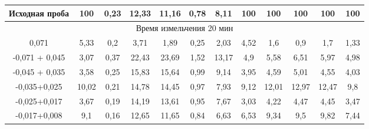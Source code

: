 {\begin{longtable}[c]{|p{}ccccccccccc|}
\multicolumn{1}{|c|}{Исходная проба} & \multicolumn{1}{c|}{100} & \multicolumn{1}{c|}{0,23} & \multicolumn{1}{c|}{12,33} & \multicolumn{1}{c|}{11,16} & \multicolumn{1}{c|}{0,78} & \multicolumn{1}{c|}{8,11} & \multicolumn{1}{c|}{100} & \multicolumn{1}{c|}{100} & \multicolumn{1}{c|}{100} & \multicolumn{1}{c|}{100} & 100 \\ \hline
\multicolumn{12}{|c|}{Время измельчения 20 мин} \\ \hline
\multicolumn{1}{|c|}{0,071} & \multicolumn{1}{c|}{5,33} & \multicolumn{1}{c|}{0,2} & \multicolumn{1}{c|}{3,71} & \multicolumn{1}{c|}{1,89} & \multicolumn{1}{c|}{0,25} & \multicolumn{1}{c|}{2,03} & \multicolumn{1}{c|}{4,52} & \multicolumn{1}{c|}{1,6} & \multicolumn{1}{c|}{0,9} & \multicolumn{1}{c|}{1,7} & 1,33 \\ \hline
\multicolumn{1}{|c|}{-0,071 + 0,045} & \multicolumn{1}{c|}{3,07} & \multicolumn{1}{c|}{0,37} & \multicolumn{1}{c|}{22,43} & \multicolumn{1}{c|}{23,69} & \multicolumn{1}{c|}{1,52} & \multicolumn{1}{c|}{13,17} & \multicolumn{1}{c|}{4,9} & \multicolumn{1}{c|}{5,58} & \multicolumn{1}{c|}{6,51} & \multicolumn{1}{c|}{5,97} & 4,98 \\ \hline
\multicolumn{1}{|c|}{-0,045 + 0,035} & \multicolumn{1}{c|}{3,58} & \multicolumn{1}{c|}{0,25} & \multicolumn{1}{c|}{15,83} & \multicolumn{1}{c|}{15,64} & \multicolumn{1}{c|}{0,99} & \multicolumn{1}{c|}{9,14} & \multicolumn{1}{c|}{3,95} & \multicolumn{1}{c|}{4,59} & \multicolumn{1}{c|}{5,01} & \multicolumn{1}{c|}{4,55} & 4,03 \\ \hline
\multicolumn{1}{|c|}{-0,035+0,025} & \multicolumn{1}{c|}{10,02} & \multicolumn{1}{c|}{0,21} & \multicolumn{1}{c|}{14,78} & \multicolumn{1}{c|}{14,45} & \multicolumn{1}{c|}{0,97} & \multicolumn{1}{c|}{7,93} & \multicolumn{1}{c|}{9,12} & \multicolumn{1}{c|}{12,01} & \multicolumn{1}{c|}{12,97} & \multicolumn{1}{c|}{12,47} & 9,8 \\ \hline
\multicolumn{1}{|c|}{-0,025+0,017} & \multicolumn{1}{c|}{3,67} & \multicolumn{1}{c|}{0,19} & \multicolumn{1}{c|}{14,19} & \multicolumn{1}{c|}{13,61} & \multicolumn{1}{c|}{0,95} & \multicolumn{1}{c|}{7,67} & \multicolumn{1}{c|}{3,03} & \multicolumn{1}{c|}{4,22} & \multicolumn{1}{c|}{4,47} & \multicolumn{1}{c|}{4,45} & 3,47 \\ \hline
\multicolumn{1}{|c|}{-0,017+0,008} & \multicolumn{1}{c|}{9,1} & \multicolumn{1}{c|}{0,16} & \multicolumn{1}{c|}{12,65} & \multicolumn{1}{c|}{11,65} & \multicolumn{1}{c|}{0,84} & \multicolumn{1}{c|}{6,63} & \multicolumn{1}{c|}{6,53} & \multicolumn{1}{c|}{9,34} & \multicolumn{1}{c|}{9,5} & \multicolumn{1}{c|}{9,82} & 7,44 \\ \hline

\end{longtable}}
